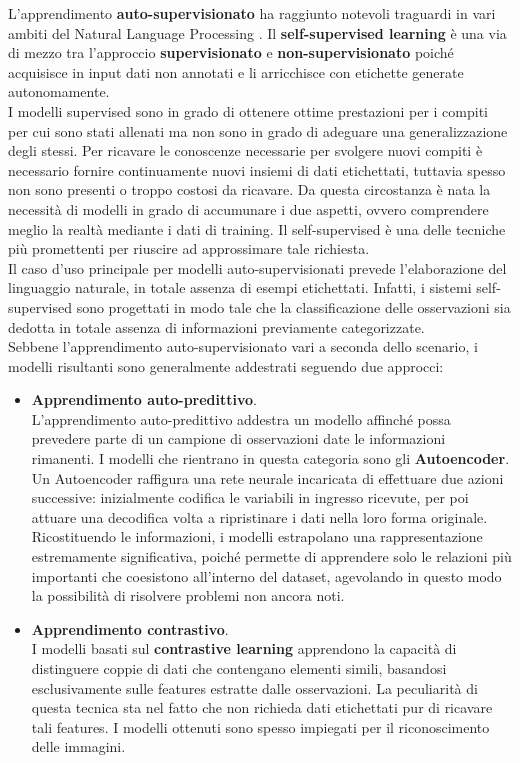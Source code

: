 L'apprendimento \textbf{auto-supervisionato} ha raggiunto notevoli traguardi in vari ambiti del Natural Language Processing \cite{DBLP:journals/corr/abs-1910-13461}. Il \textbf{self-supervised learning} è una via di mezzo tra l'approccio \textbf{supervisionato} e \textbf{non-supervisionato} poiché acquisisce in input dati non annotati e li arricchisce con etichette generate autonomamente. \vspace{7pt} \\
I modelli supervised sono in grado di ottenere ottime prestazioni per i compiti per cui sono stati allenati ma non sono in grado di adeguare una generalizzazione degli stessi. Per ricavare le conoscenze necessarie per svolgere nuovi compiti è necessario fornire continuamente nuovi insiemi di dati etichettati, tuttavia spesso non sono presenti o troppo costosi da ricavare. Da questa circostanza è nata la necessità di modelli in grado di accumunare i due aspetti, ovvero comprendere meglio la realtà mediante i dati di training. Il self-supervised è una delle tecniche più promettenti per riuscire ad approssimare tale richiesta.  \vspace{7pt} \\
Il caso d'uso principale per modelli auto-supervisionati prevede l'elaborazione del linguaggio naturale, in totale assenza di esempi etichettati. Infatti, i sistemi self-supervised sono progettati in modo tale che la classificazione delle osservazioni sia dedotta in totale assenza di informazioni previamente categorizzate. \vspace{7pt} \\  
Sebbene l'apprendimento auto-supervisionato vari a seconda dello scenario, i modelli risultanti sono generalmente addestrati seguendo due approcci:
\begin{itemize}
    \renewcommand{\labelitemi}{-}
    \item \textbf{Apprendimento auto-predittivo}. \\ L'apprendimento auto-predittivo addestra un modello affinché possa prevedere parte di un campione di osservazioni date le informazioni rimanenti. I modelli che rientrano in questa categoria sono gli \textbf{Autoencoder}. Un Autoencoder raffigura una rete neurale incaricata di effettuare due azioni successive: inizialmente codifica le variabili in ingresso ricevute, per poi attuare una decodifica volta a ripristinare i dati nella loro forma originale. Ricostituendo le informazioni, i modelli estrapolano una rappresentazione estremamente significativa, poiché permette di apprendere solo le relazioni più importanti che coesistono all'interno del dataset, agevolando in questo modo la possibilità di risolvere problemi non ancora noti.
    \item \textbf{Apprendimento contrastivo}. \\
    I modelli basati sul \textbf{contrastive learning} apprendono la capacità di distinguere coppie di dati che contengano elementi simili, basandosi esclusivamente sulle features estratte dalle osservazioni. La peculiarità di questa tecnica sta nel fatto che non richieda dati etichettati pur di ricavare tali features. I modelli ottenuti sono spesso impiegati per il riconoscimento delle immagini.
\end{itemize}
